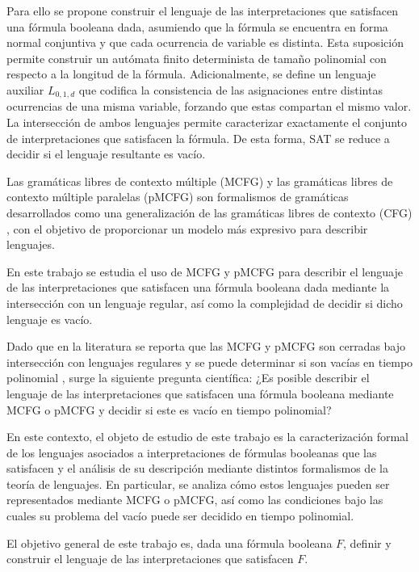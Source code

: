 Para ello se propone construir el lenguaje de las interpretaciones que satisfacen una fórmula booleana dada, asumiendo que la fórmula se encuentra en forma normal conjuntiva y que cada ocurrencia de variable es distinta. Esta suposición permite construir un autómata finito determinista de tamaño polinomial con respecto a la longitud de la fórmula. Adicionalmente, se define un lenguaje auxiliar $L_{0,1,d}$ que codifica la consistencia de las asignaciones entre distintas ocurrencias de una misma variable, forzando que estas compartan el mismo valor. La intersección de ambos lenguajes permite caracterizar exactamente el conjunto de interpretaciones que satisfacen la fórmula. De esta forma, SAT se reduce a decidir si el lenguaje resultante es vacío.

Las gramáticas libres de contexto múltiple (MCFG) y las gramáticas libres de contexto múltiple paralelas (pMCFG) \cite{Seki1991OnMC} son formalismos de gramáticas desarrollados como una generalización de las gramáticas libres de contexto (CFG) \cite{automataTheory}, con el objetivo de proporcionar un modelo más expresivo para describir lenguajes.

En este trabajo se estudia el uso de MCFG y pMCFG para describir el lenguaje de las interpretaciones que satisfacen una fórmula booleana dada mediante la intersección con un lenguaje regular, así como la complejidad de decidir si dicho lenguaje es vacío.

Dado que en la literatura se reporta que las MCFG y pMCFG son cerradas bajo intersección con lenguajes regulares y se puede determinar si son vacías en tiempo polinomial \cite{Seki1991OnMC}, surge la siguiente pregunta científica: ¿Es posible describir el lenguaje de las interpretaciones que satisfacen una fórmula booleana mediante MCFG o pMCFG y decidir si este es vacío en tiempo polinomial?

En este contexto, el objeto de estudio de este trabajo es la caracterización formal de los lenguajes asociados a interpretaciones de fórmulas booleanas que las satisfacen y el análisis de su descripción mediante distintos formalismos de la teoría de lenguajes. En particular, se analiza cómo estos lenguajes pueden ser representados mediante MCFG o pMCFG, así como las condiciones bajo las cuales su problema del vacío puede ser decidido en tiempo polinomial.

El objetivo general de este trabajo es, dada una fórmula booleana $F$, definir y construir el lenguaje de las interpretaciones que satisfacen $F$.

